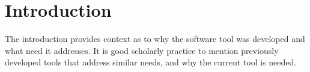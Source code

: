 \section*{Introduction}


The introduction provides context as to why the software tool was developed and what need it addresses.  It is good scholarly practice to mention previously developed tools that address similar needs, and why the current tool is needed. 
